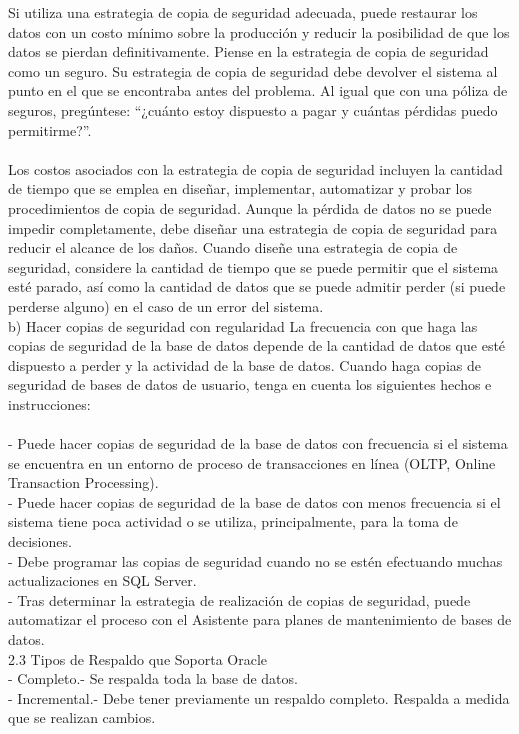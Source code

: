 \begin{enumerate}[3.1.]
Si utiliza una estrategia de copia de seguridad adecuada, puede restaurar los datos con un costo mínimo sobre la producción y reducir la posibilidad de que los datos se pierdan definitivamente. Piense en la estrategia de copia de seguridad como un seguro. Su estrategia de copia de seguridad debe devolver el sistema al punto en el que se encontraba antes del problema. Al igual que con una póliza de seguros, pregúntese: “¿cuánto estoy dispuesto a pagar y cuántas pérdidas puedo permitirme?”.
\\
\\Los costos asociados con la estrategia de copia de seguridad incluyen la cantidad de tiempo que se emplea en diseñar, implementar, automatizar y probar los procedimientos de copia de seguridad. Aunque la pérdida de datos no se puede impedir completamente, debe diseñar una estrategia de copia de seguridad para reducir el alcance de los daños. Cuando diseñe una estrategia de copia de seguridad, considere la cantidad de tiempo que se puede permitir que el sistema esté parado, así como la cantidad de datos que se puede admitir perder (si puede perderse alguno) en el caso de un error del sistema.
\\
b) Hacer copias de seguridad con regularidad
La frecuencia con que haga las copias de seguridad de la base de datos depende de la cantidad de datos que esté dispuesto a perder y la actividad de la base de datos. Cuando haga copias de seguridad de bases de datos de usuario, tenga en cuenta los siguientes hechos e instrucciones:
\\
\\- Puede hacer copias de seguridad de la base de datos con frecuencia si el sistema se encuentra en un entorno de proceso de transacciones en línea (OLTP, Online Transaction Processing).
\\-	Puede hacer copias de seguridad de la base de datos con menos frecuencia si el sistema tiene poca actividad o se utiliza, principalmente, para la toma de decisiones.
\\-	Debe programar las copias de seguridad cuando no se estén efectuando muchas actualizaciones en SQL Server.
\\-	Tras determinar la estrategia de realización de copias de seguridad, puede automatizar el proceso con el Asistente para planes de mantenimiento de bases de datos.
\\2.3 Tipos de Respaldo que Soporta Oracle
\\-	Completo.- Se respalda toda la base de datos.
\\-	Incremental.- Debe tener previamente un respaldo completo. Respalda a medida que se realizan cambios.

\end{enumerate}
